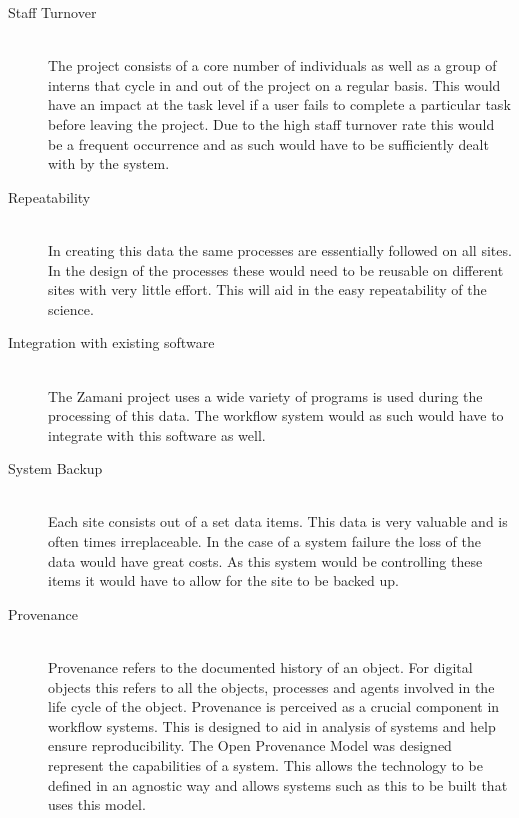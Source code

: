 \documentclass[12pt,a4paper]{report}
\begin{document}
\begin{description}
    \item[Staff Turnover] \hfill \\
        The project consists of a core number of individuals as well as
        a group of interns that cycle in and out of the project on a regular
        basis. This would have an impact at the task
        level if a user fails to complete a particular task before leaving
        the project. Due to the high staff turnover rate this would
        be a frequent occurrence and as such would have to be sufficiently
        dealt with by the system.

    \item[Repeatability] \hfill \\
        In creating this data the same processes are essentially followed
        on all sites. In the design of the processes these would need to
        be reusable on different sites with very little effort. This
        will aid in the easy repeatability of the science.

    \item[Integration with existing software] \hfill \\
        The Zamani project uses a wide variety of programs is used during
        the processing of this data. The workflow system would as such
        would have to integrate with this software as well.

    \item[System Backup] \hfill \\
        Each site consists out of a set data items. This data is very valuable
        and is often times irreplaceable. In the case of a system failure
        the loss of the data would have great costs. As this system would
        be controlling these items it would have to allow for the site
        to be backed up.

    \item[Provenance] \hfill \\
        Provenance refers to the documented history of an object\cite{moreau2008open}. For
        digital objects this refers to all the objects, processes and agents
        involved in the life cycle of the object. Provenance is perceived as
        a crucial component in workflow systems. This is designed to aid in
        analysis of systems and help ensure reproducibility. The Open
        Provenance Model was designed represent the capabilities of a system.
        This allows the technology to be defined in an agnostic way and
        allows systems such as this to be built that uses this model.


\end{description}
\end{document}
